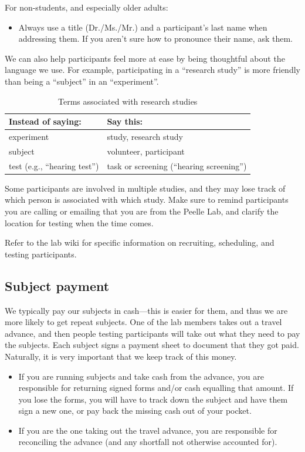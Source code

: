\documentclass[letterpaper,12pt,oneside]{memoir}
\begin{document}
For non-students, and especially older adults:

\begin{itemize}
\item Always use a title (Dr./Ms./Mr.) and a participant's last name when addressing them. If you aren't sure how to pronounce their name, ask them.
\end{itemize}

We can also help participants feel more at ease by being thoughtful about the language we use. For example, participating in a ``research study'' is more friendly than being a ``subject'' in an ``experiment''.

\begin{table}
\centering
\caption{Terms associated with research studies}
\begin{tabular}{ll}
\toprule
Instead of saying: & Say this:\\
\midrule
experiment& study, research study\\
subject& volunteer, participant\\
test (e.g., ``hearing test'')& task or screening (``hearing screening'')\\
\bottomrule
\end{tabular}
\end{table}


Some participants are involved in multiple studies, and they may lose track of which person is associated with which study. Make sure to remind participants you are calling or emailing that you are from the Peelle Lab, and clarify the location for testing when the time comes.

Refer to the lab wiki for specific information on recruiting, scheduling, and testing participants.


\subsection{Subject payment}
\label{sec:subject_payment}

We typically pay our subjects in cash---this is easier for them, and thus we are more likely to get repeat subjects. One of the lab members takes out a travel advance, and then people testing participants will take out what they need to pay the subjects. Each subject signs a payment sheet to document that they got paid. Naturally, it is very important that we keep track of this money.

\begin{itemize}

\item If you are running subjects and take cash from the advance, you are responsible for returning signed forms and/or cash equalling that amount. If you lose the forms, you will have to track down the subject and have them sign a new one, or pay back the missing cash out of your pocket.

\item If you are the one taking out the travel advance, you are responsible for reconciling the advance (and any shortfall not otherwise accounted for).

\end{itemize}
\end{document}
